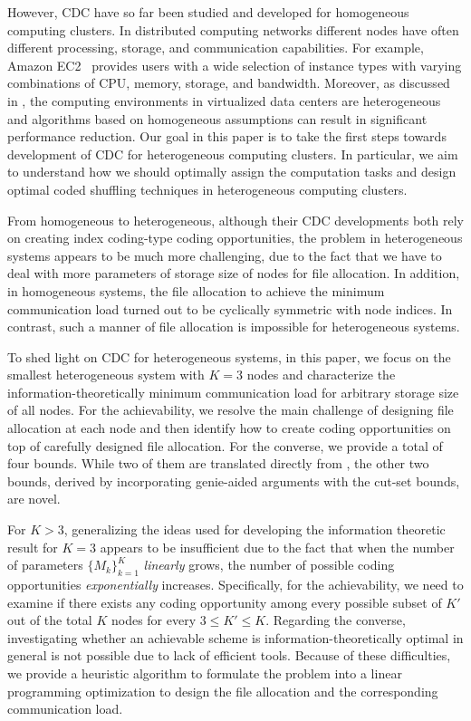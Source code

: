 \documentclass[conference]{IEEEtran}
\begin{document}
However, CDC have so far been studied and developed for  homogeneous computing clusters. In distributed computing networks different nodes have often different processing, storage, and communication capabilities. For example, Amazon EC2~\cite{AmazonEC2} provides users with a wide selection of instance types with varying combinations of CPU, memory, storage, and bandwidth. Moreover, as discussed in \cite{zaharia2008improving}, the computing environments in virtualized data centers are heterogeneous and algorithms based on homogeneous assumptions can result in significant performance reduction. Our goal in this paper is to take the first steps towards development of CDC for heterogeneous computing clusters. In particular, we aim to understand how we should optimally assign the computation tasks and design optimal coded shuffling techniques in heterogeneous computing clusters.

From homogeneous to heterogeneous, although their CDC developments both rely on creating index coding-type coding opportunities, the problem in heterogeneous systems appears to be much more challenging, due to the fact that we have to deal with more parameters of storage size of nodes for file allocation. In addition, in homogeneous systems, the file allocation to achieve the minimum communication load turned out to be cyclically symmetric with node indices. In contrast, such a manner of file allocation is impossible for heterogeneous systems.

To shed light on CDC for heterogeneous systems, in this paper, we focus on the smallest heterogeneous system with $K\!=\!3$ nodes and characterize the information-theoretically minimum communication load for arbitrary storage size of all nodes. For the achievability, we resolve the main challenge of designing file allocation at each node and then identify how to create coding opportunities on top of carefully designed file allocation. For the converse, we provide a total of four bounds. While two of them are translated directly from \cite{Avestimehr_CDC}, the other two bounds, derived by incorporating genie-aided arguments with the cut-set bounds, are novel. %

For $K\!>\!3$, generalizing the ideas used for developing the information theoretic result for $K=3$ appears to be insufficient due to the fact that when the number of parameters $\{M_k\}_{k=1}^K$ \emph{linearly} grows, the number of possible coding opportunities \emph{exponentially} increases. Specifically, for the achievability, we need to examine if there exists any coding opportunity among every possible subset of $K'$ out of the total $K$ nodes for every $3\leq K'\leq K$. Regarding the converse, investigating whether an achievable scheme is information-theoretically optimal in general is not possible due to lack of efficient tools. Because of these difficulties, we provide a heuristic algorithm to formulate the problem into a linear programming optimization to design the file allocation and the corresponding communication load.
\end{document}
